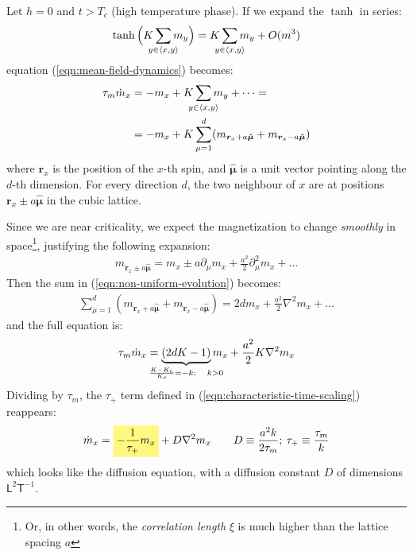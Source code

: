 \documentclass[../../main.tex]{subfiles}
\begin{document}
Let $h=0$ and $t > T_c$ (high temperature phase). If we expand the $\tanh$ in series:
\begin{align*}
    \tanh \Big(K \sum_{\mathclap{y \in \langle x,y \rangle}} m_y\Big) = K \sum_{\mathclap{y \in \langle x,y \rangle}} m_y + O(m^3)
\end{align*}
equation (\ref{eqn:mean-field-dynamics}) becomes:
\begin{align}\nonumber
    \tau_m \dot{m}_x &= - m_x + K \sum_{\mathclap{y \in \langle x,y \rangle}} m_y + \dots =\\
    &= -m_x + K \sum_{\mu=1}^d (m_{\bm{r}_x + a \bm{\hat{\mu}}} + m_{\bm{r}_x - a \bm{\hat{\mu}}}) \label{eqn:non-uniform-evolution}
\end{align}
where $\bm{r}_x$ is the position of the $x$-th spin, and $\bm{\hat{\mu}}$ is a unit vector pointing along the $d$-th dimension. For every direction $d$, the two neighbour of $x$ are at positions $\bm{r}_x \pm a \bm{\hat{\mu}}$ in the cubic lattice.

\medskip

Since we are near criticality, we expect the magnetization to change \textit{smoothly} in space\footnote{Or, in other words, the \textit{correlation length} $\xi$ is much higher than the lattice spacing $a$}, justifying the following expansion:
\begin{align}\label{eqn:magnetization-expansion}
    m_{\bm{r}_x \pm a \bm{\hat{\mu}}} = m_x \pm a \partial_\mu m_x + \frac{a^2}{2} \partial_\mu^2 m_x + \dots  
\end{align} 
Then the sum in (\ref{eqn:non-uniform-evolution}) becomes:
\begin{align*}
    \sum_{\mu=1}^d (m_{\bm{r}_x + a\bm{\hat{\mu}}} + m_{\bm{r}_x - a \bm{\hat{\mu}}}) = 2d m_x + \frac{a^2}{2} \nabla^2 m_x + \dots 
\end{align*}
and the full equation is:
\begin{align*}
    \tau_m \dot{m}_x = \underbrace{(2dK - 1)}_{\mathclap{\frac{K - K_c}{K_c} = -k; \quad k > 0}} m_x + \frac{a^2}{2} K \nabla^2 m_x 
\end{align*}
Dividing by $\tau_m$, the $\tau_+$ term defined in (\ref{eqn:characteristic-time-scaling}) reappears:
\begin{align}\label{eqn:magnetization-diffusion}
    \dot{m}_x = \hlc{Yellow}{- \frac{1}{\tau_+} m_x }+ D \nabla^2 m_x \qquad D \equiv \frac{a^2 k}{2 \tau_m}; \> \tau_+ \equiv \frac{\tau_m}{k} 
\end{align}
which looks like the diffusion equation, with a diffusion constant $D$ of dimensions $\mathsf{L}^2\mathsf{T}^{-1}$.
\end{document}
